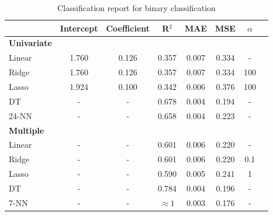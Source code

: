 \begin{table}[H]
    \centering
    \begin{tabular}{lccccccc}
        \toprule
         & \textbf{Intercept} & \textbf{Coefficient} & \textbf{R$^2$} & \textbf{MAE} & \textbf{MSE} & \textbf{$\alpha$} \\
        \midrule
        \textbf{Univariate} \\
        \midrule
        Linear & 1.760 & 0.126 & 0.357 & 0.007 & 0.334 & - \\
        Ridge & 1.760 & 0.126 & 0.357 & 0.007 & 0.334 & 100 \\ %
        Lasso & 1.924 & 0.100 & 0.342 & 0.006 & 0.376 & 100 \\ %
        DT & - & - & 0.678 & 0.004 & 0.194 & - \\
        24-NN & - & - & 0.658 & 0.004 & 0.223 & - \\
        \midrule
        \textbf{Multiple}\\
        \midrule
        Linear & - & - & 0.601 & 0.006 & 0.220 & - \\
        Ridge & - & - & 0.601 & 0.006 & 0.220 & 0.1 \\ %
        Lasso & - & - & 0.590 & 0.005 & 0.241 & 1 \\ %
        DT & - & - & 0.784 & 0.004 & 0.196 & - \\
        7-NN & - & - & $\approx 1$ & 0.003 & 0.176 & - \\
        \bottomrule
    \end{tabular}
    \caption{Classification report for binary classification}
    \label{tab:binary_classification_report}
\end{table}
